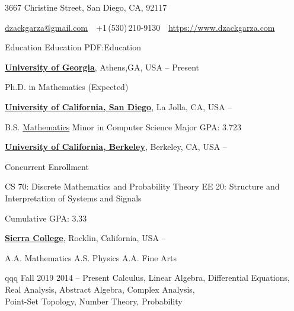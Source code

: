 \documentclass[letterpaper,MMMyyyy,nonstopmode]{simpleresumecv}
\newcommand{\CVAuthor}{D. Zack Garza}
\newcommand{\CVWebpage}{https://www.dzackgarza.com}
\begin{document}

\Title{\CVAuthor}

\begin{SubTitle}
3667 Christine Street, San Diego, CA, 92117
\par
\href{mailto:dzackgarza@gmail.com}
{dzackgarza@gmail.com}
\,\SubBulletSymbol\,
+1\,(530)\,210-9130
\,\SubBulletSymbol\,
\href{\CVWebpage}
{\url{\CVWebpage}}
\end{SubTitle}

\begin{Body}


\Section
{Education}
{Education}
{PDF:Education}

\Entry
\href{https://www.math.uga.edu/}
{\textbf{University of Georgia}},
Athens,GA, USA
\hfill
{} --
Present

\Gap
\BulletItem Ph.D. in Mathematics (Expected)

\BigGap
\Entry
\href{https://www.math.ucsd.edu}
{\textbf{University of California, San Diego}},
La Jolla, CA, USA
\hfill
{} --

\Gap
\BulletItem
B.S.
\href{https://math.ucsd.edu/programs/undergraduate/}
{Mathematics}
\BulletItem Minor in Computer Science
\BulletItem
Major GPA: 3.723

\BigGap
\Entry
\href{https://eecs.berkeley.edu}
{\textbf{University of California, Berkeley}},
Berkeley, CA, USA
\hfill
{} --
\Gap

\BulletItem
Concurrent Enrollment
\begin{Detail}
\SubBulletItem
CS 70: Discrete Mathematics and Probability Theory
\SubBulletItem
EE 20: Structure and Interpretation of Systems and Signals
\end{Detail}
\BulletItem
Cumulative GPA: 3.33


\BigGap
\Entry
\href{https://www.sierracollege.edu}
{\textbf{Sierra College}},
Rocklin, California, USA
\hfill
{} --

\Gap
\BulletItem
A.A. Mathematics
\hfill
\BulletItem
A.S. Physics
\hfill
\BulletItem
A.A. Fine Arts



\BulletItem qqq \hfill Fall 2019
\hfill
2014 -- Present
\Gap
\BulletItem Calculus, Linear Algebra, Differential Equations, \\
Real Analysis, Abstract Algebra, Complex Analysis, \\
Point-Set Topology, Number Theory, Probability


\end{Body}
\end{document}
